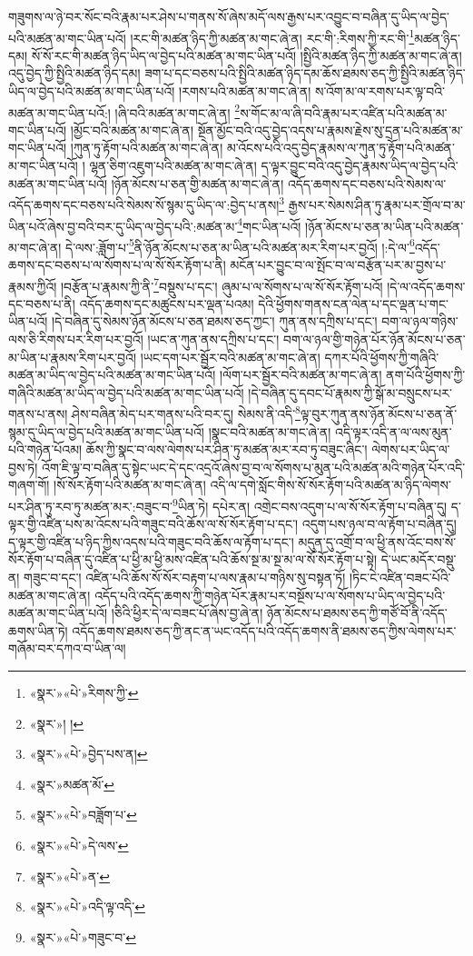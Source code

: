 གཟུགས་ལ་ཉེ་བར་སོང་བའི་རྣམ་པར་ཤེས་པ་གནས་སོ་ཞེས་མདོ་ལས་རྒྱས་པར་འབྱུང་བ་བཞིན་དུ་ཡིད་ལ་བྱེད་པའི་མཚན་མ་གང་ཡིན་པའོ། །རང་གི་མཚན་ཉིད་ཀྱི་མཚན་མ་གང་ཞེ་ན། རང་གི་:རིགས་ཀྱི་རང་གི་\footnote{«སྣར་»«པེ་»རིགས་ཀྱི་}མཚན་ཉིད་དམ། སོ་སོ་རང་གི་མཚན་ཉིད་ཡིད་ལ་བྱེད་པའི་མཚན་མ་གང་ཡིན་པའོ། །སྤྱིའི་མཚན་ཉིད་ཀྱི་མཚན་མ་གང་ཞེ་ན། འདུ་བྱེད་ཀྱི་སྤྱིའི་མཚན་ཉིད་དམ། ཟག་པ་དང་བཅས་པའི་སྤྱིའི་མཚན་ཉིད་དམ་ཆོས་ཐམས་ཅད་ཀྱི་སྤྱིའི་མཚན་ཉིད་ཡིད་ལ་བྱེད་པའི་མཚན་མ་གང་ཡིན་པའོ། །རགས་པའི་མཚན་མ་གང་ཞེ་ན། ས་འོག་མ་ལ་རགས་པར་ལྟ་བའི་མཚན་མ་གང་ཡིན་པའོ:། །ཞི་བའི་མཚན་མ་གང་ཞེ་ན། \footnote{«སྣར་»། ། }ས་གོང་མ་ལ་ཞི་བའི་རྣམ་པར་འཛིན་པའི་མཚན་མ་གང་ཡིན་པའོ། །མྱོང་བའི་མཚན་མ་གང་ཞེ་ན། སྔོན་མྱོང་བའི་འདུ་བྱེད་འདས་པ་རྣམས་རྗེས་སུ་དྲན་པའི་མཚན་མ་གང་ཡིན་པའོ། །ཀུན་ཏུ་རྟོག་པའི་མཚན་མ་གང་ཞེ་ན། མ་འོངས་པའི་འདུ་བྱེད་རྣམས་ལ་ཀུན་ཏུ་རྟོག་པའི་མཚན་མ་གང་ཡིན་པའོ། །
ལྷན་ཅིག་འཇུག་པའི་མཚན་མ་གང་ཞེ་ན། ད་ལྟར་བྱུང་བའི་འདུ་བྱེད་རྣམས་ཡིད་ལ་བྱེད་པའི་མཚན་མ་གང་ཡིན་པའོ། །ཉོན་མོངས་པ་ཅན་གྱི་མཚན་མ་གང་ཞེ་ན། འདོད་ཆགས་དང་བཅས་པའི་སེམས་ལ་འདོད་ཆགས་དང་བཅས་པའི་སེམས་སོ་སྙམ་དུ་ཡིད་ལ་:བྱེད་པ་ནས།\footnote{«སྣར་»«པེ་»བྱེད་པས་ན།} རྒྱས་པར་སེམས་ཤིན་ཏུ་རྣམ་པར་གྲོལ་བ་མ་ཡིན་པའོ་ཞེས་བྱ་བའི་བར་དུ་ཡིད་ལ་བྱེད་པའི་:མཚན་མ་\footnote{«སྣར་»མཚན་མོ་}གང་ཡིན་པའོ། །ཉོན་མོངས་པ་ཅན་མ་ཡིན་པའི་མཚན་མ་གང་ཞེ་ན། དེ་ལས་:ཟློག་པ་\footnote{«སྣར་»«པེ་»བཟློག་པ་}ནི་ཉོན་མོངས་པ་ཅན་མ་ཡིན་པའི་མཚན་མར་རིག་པར་བྱའོ། །:དེ་ལ་\footnote{«སྣར་»«པེ་»དེ་ལས་}འདོད་ཆགས་དང་བཅས་པ་ལ་སོགས་པ་ལ་སོ་སོར་རྟོག་པ་ནི། མངོན་པར་བྱུང་བ་ལ་སྤོང་བ་ལ་བརྩོན་པར་མ་བྱས་པ་རྣམས་ཀྱིའོ། །བརྩོན་པ་རྣམས་ཀྱི་ནི་\footnote{«སྣར་»«པེ་»ན་}བསྡུས་པ་དང་། ཞུམ་པ་ལ་སོགས་པ་ལ་སོ་སོར་རྟོག་པའོ། །དེ་ལ་འདོད་ཆགས་དང་བཅས་པ་ནི། འདོད་ཆགས་དང་མཚུངས་པར་ལྡན་པའམ། དེའི་ཕྱོགས་གནས་ངན་ལེན་པ་དང་ལྡན་པ་གང་ཡིན་པའོ། །དེ་བཞིན་དུ་སེམས་ཉོན་མོངས་པ་ཅན་ཐམས་ཅད་ཀྱང་། ཀུན་ནས་དཀྲིས་པ་དང་། བག་ལ་ཉལ་གཉིས་ལས་ཅི་རིགས་པར་རིག་པར་བྱའོ། །ཡང་ན་ཀུན་ནས་དཀྲིས་པ་དང་། བག་ལ་ཉལ་གྱི་གཉེན་པོར་ཉོན་མོངས་པ་ཅན་མ་ཡིན་པ་རྣམས་རིག་པར་བྱའོ། །ཡང་དག་པར་སྦྱོར་བའི་མཚན་མ་གང་ཞེ་ན། དཀར་པོའི་ཕྱོགས་ཀྱི་གཞིའི་མཚན་མ་ཡིད་ལ་བྱེད་པའི་མཚན་མ་གང་ཡིན་པའོ། །ལོག་པར་སྦྱོར་བའི་མཚན་མ་གང་ཞེ་ན། ནག་པོའི་ཕྱོགས་ཀྱི་གཞིའི་མཚན་མ་ཡིད་ལ་བྱེད་པའི་མཚན་མ་གང་ཡིན་པའོ། །དེ་བཞིན་དུ་དབང་པོ་རྣམས་ཀྱི་སྒོ་མ་བསྲུངས་པར་གནས་པ་ནས། ཤེས་བཞིན་མེད་པར་གནས་པའི་བར་དུ། སེམས་ནི་འདི་\footnote{«སྣར་»«པེ་»འདི་ལྟ་འདི་}ལྟ་བུར་ཀུན་ནས་ཉོན་མོངས་པ་ཅན་ནོ་སྙམ་དུ་ཡིད་ལ་བྱེད་པའི་མཚན་མ་གང་ཡིན་པའོ། །སྣང་བའི་མཚན་མ་གང་ཞེ་ན། འདི་ལྟར་འདི་ན་ལ་ལས་མུན་པའི་གཉེན་པོའམ། ཆོས་ཀྱི་སྣང་བ་ལས་ལེགས་པར་ཤིན་ཏུ་མཚན་མར་རབ་ཏུ་བཟུང་ཞིང་། ལེགས་པར་ཡིད་ལ་བྱས་ཏེ། འོག་ཇི་ལྟ་བ་བཞིན་དུ་སྟེང་ཡང་དེ་དང་འདྲའོ་ཞེས་བྱ་བ་ལ་སོགས་པ་མུན་པའི་མཚན་མའི་གཉེན་པོར་འདི་གཞག་གོ། །སོ་སོར་རྟོག་པའི་མཚན་མ་གང་ཞེ་ན། འདི་ལ་དགེ་སློང་གིས་སོ་སོར་རྟོག་པའི་མཚན་མ་ཉིད་ལེགས་པར་ཤིན་ཏུ་རབ་ཏུ་མཚན་མར་:བཟུང་བ་\footnote{«སྣར་»«པེ་»གཟུང་བ་}ཡིན་ཏེ། དཔེར་ན། འགྲེང་བས་འདུག་པ་ལ་སོ་སོར་རྟོག་པ་བཞིན་དུ། ད་ལྟར་གྱི་འཛིན་པས་མ་འོངས་པའི་གཟུང་བའི་ཆོས་ལ་སོ་སོར་རྟོག་པ་དང་། འདུག་པས་ཉལ་བ་ལ་རྟོག་པ་བཞིན་དུ། ད་ལྟར་གྱི་འཛིན་པ་ཉིད་ཀྱིས་འདས་པའི་གཟུང་བའི་ཆོས་ལ་རྟོག་པ་དང་། མདུན་དུ་འགྲོ་བ་ལ་ཕྱི་ནས་འོང་བས་སོ་སོར་རྟོག་པ་བཞིན་དུ་འཛིན་པ་ཕྱི་མ་ཕྱི་མས་འཛིན་པའི་ཆོས་སྔ་མ་སྔ་མ་ལ་སོ་སོར་རྟོག་པ་སྟེ། དེ་ཡང་མདོར་བསྡུ་ན། གཟུང་བ་དང་། འཛིན་པའི་ཆོས་སོ་སོར་བརྟག་པ་ལས་རྣམ་པ་གཉིས་སུ་བསྟན་ཏོ། །ཏིང་ངེ་འཛིན་བཟང་པོའི་མཚན་མ་གང་ཞེ་ན། འདོད་པའི་འདོད་ཆགས་ཀྱི་གཉེན་པོར་རྣམ་པར་བསྔོས་པ་ལ་སོགས་པ་ཡིད་ལ་བྱེད་པའི་མཚན་མ་གང་ཡིན་པའོ། །ཅིའི་ཕྱིར་དེ་ལ་བཟང་པོ་ཞེས་བྱ་ཞེ་ན། ཉོན་མོངས་པ་ཐམས་ཅད་ཀྱི་གཙོ་བོ་ནི་འདོད་ཆགས་ཡིན་ཏེ། འདོད་ཆགས་ཐམས་ཅད་ཀྱི་ནང་ན་ཡང་འདོད་པའི་འདོད་ཆགས་ནི་ཐམས་ཅད་ཀྱིས་ལེགས་པར་གཞོམ་བར་དཀའ་བ་ཡིན་ལ། 